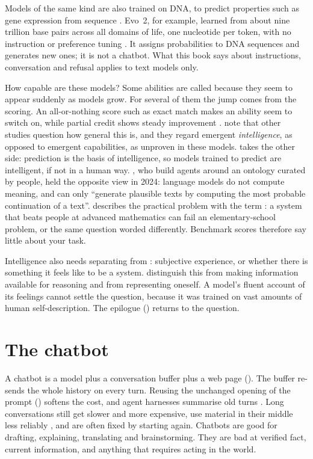 Models of the same kind are also trained on DNA, to predict properties such as
gene expression from sequence \parencite{stelzer2026nativebio}. Evo~2, for
example, learned from about nine trillion base pairs across all domains of
life, one nucleotide per token, with no instruction or preference tuning
\parencite{brixi2026evo2}. It assigns probabilities to DNA sequences and
generates new ones; it is not a chatbot. What this book says about
instructions, conversation and refusal applies to text models only.

How capable are these models? Some abilities are called 
because they seem to appear suddenly as models grow. For several of them the
jump comes from the scoring. An all-or-nothing score such as exact match makes
an ability seem to switch on, while partial credit shows steady improvement
\parencite{schaeffer2023mirage}. \textcite{krakauer2026emergence} note that
other studies question how general this is, and they regard emergent
\emph{intelligence}, as opposed to emergent capabilities, as unproven in these
models. \textcite{aguerayarcas2025intelligence} takes the other side:
prediction is the basis of intelligence, so models trained to predict are
intelligent, if not in a human way. \textcite{mcshane2024agents}, who build
agents around an ontology curated by people, held the opposite view in 2024:
language models do not compute meaning, and can only ``generate plausible texts
by computing the most probable continuation of a text''. \textcite{mitchell2026jagged}
describes the practical problem with the term : a
system that beats people at advanced mathematics can fail an elementary-school
problem, or the same question worded differently. Benchmark scores therefore
say little about your task.

Intelligence also needs separating from :
subjective experience, or whether there is something it feels like to be a
system. \textcite{chandaria2026consciousness} distinguish this from making
information available for reasoning and from representing oneself. A model's
fluent account of its feelings cannot settle the question, because it was
trained on vast amounts of human self-description. The epilogue
() returns to the question.

\section{The chatbot}

A chatbot is a model plus a conversation buffer plus a web page
(). The buffer
re-sends the whole history on every turn. Reusing the unchanged opening of the
prompt () softens the cost, and agent harnesses summarise
old turns \parencite{liu2026claudecode}. Long conversations still get slower and
more expensive, use material in their middle less reliably
\parencite{liu2023lostmiddle}, and are often fixed by starting again.
Chatbots are good for drafting, explaining, translating and brainstorming.
They are bad at verified fact, current information, and anything that requires
acting in the world.

